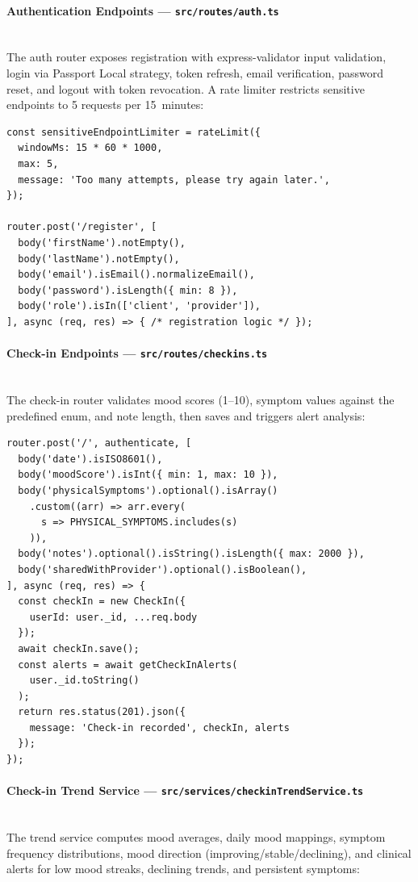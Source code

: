 \documentclass[12pt,letterpaper]{article}
\begin{document}
\paragraph{Authentication Endpoints --- \texttt{src/routes/auth.ts}}
\mbox{}\\
The auth router exposes registration with express-validator input validation, login via Passport Local strategy, token refresh, email verification, password reset, and logout with token revocation. A rate limiter restricts sensitive endpoints to 5 requests per 15~minutes:

\begin{lstlisting}[caption={Auth route registration endpoint (\texttt{auth.ts})}]
const sensitiveEndpointLimiter = rateLimit({
  windowMs: 15 * 60 * 1000,
  max: 5,
  message: 'Too many attempts, please try again later.',
});

router.post('/register', [
  body('firstName').notEmpty(),
  body('lastName').notEmpty(),
  body('email').isEmail().normalizeEmail(),
  body('password').isLength({ min: 8 }),
  body('role').isIn(['client', 'provider']),
], async (req, res) => { /* registration logic */ });
\end{lstlisting}

\paragraph{Check-in Endpoints --- \texttt{src/routes/checkins.ts}}
\mbox{}\\
The check-in router validates mood scores (1--10), symptom values against the predefined enum, and note length, then saves and triggers alert analysis:

\begin{lstlisting}[caption={Check-in creation endpoint (\texttt{checkins.ts})}]
router.post('/', authenticate, [
  body('date').isISO8601(),
  body('moodScore').isInt({ min: 1, max: 10 }),
  body('physicalSymptoms').optional().isArray()
    .custom((arr) => arr.every(
      s => PHYSICAL_SYMPTOMS.includes(s)
    )),
  body('notes').optional().isString().isLength({ max: 2000 }),
  body('sharedWithProvider').optional().isBoolean(),
], async (req, res) => {
  const checkIn = new CheckIn({
    userId: user._id, ...req.body
  });
  await checkIn.save();
  const alerts = await getCheckInAlerts(
    user._id.toString()
  );
  return res.status(201).json({
    message: 'Check-in recorded', checkIn, alerts
  });
});
\end{lstlisting}

\paragraph{Check-in Trend Service --- \texttt{src/services/checkinTrendService.ts}}
\mbox{}\\
The trend service computes mood averages, daily mood mappings, symptom frequency distributions, mood direction (improving/stable/declining), and clinical alerts for low mood streaks, declining trends, and persistent symptoms:
\end{document}
